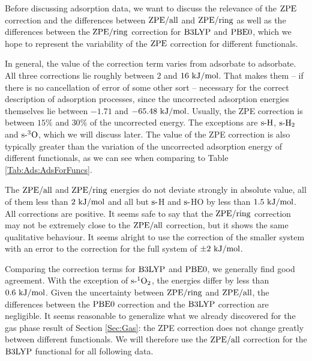 \documentclass[8.5pt,twoside,twocolumn]{article}
\newcommand\zpe{\enmat{\te{ZPE}}}
\newcommand\zpering{\enmat{\zpe/\te{ring}}}
\newcommand\zpeall{\enmat{\zpe/\te{all}}}
\newcommand\sur{\enmat{\te{s-}}}
\newcommand\tripo{\enmat{{^3\te{O}}}}
\newcommand\singot{\enmat{{^1\ot}}}
\newcommand\kmo{\enmat{\te {kJ/mol}}}
\theoremstyle{standard}
\begin{document}

Before discussing adsorption data, we want to discuss the relevance of the
$\zpe$ correction and the differences between $\zpeall$ and $\zpering$
as well as the differences between the $\zpering$ correction for $\text{B3LYP}$ and
$\text{PBE0}$, which we hope to represent the variability of the
$\zpe$ correction for different functionals.

In general, the value of the correction term varies from
adsorbate to adsorbate. All three corrections lie roughly between $2$
and $16~\kmo$. That makes them -- if there is no cancellation
of error of some other sort -- necessary for the correct description
of adsorption processes, since the uncorrected adsorption energies
themselves lie between $-1.71$ and $-65.48~\kmo$. Usually, the ZPE correction
is between $15\%$ and $30\%$ of the uncorrected energy. The exceptions are
$\sur{\te H}$, $\sur{\htw}$ and $\sur{\tripo}$, which we will discuss later. The
value of the ZPE correction is also typically greater than the variation of the
uncorrected adsorption energy of different functionals, as we can see when
comparing to Table \ref{Tab:Ads:AdsForFuncs}.

The $\zpeall$ and $\zpering$ energies
do not deviate strongly in absolute value, all of them less than $2~\kmo$
and all but $\sur$H and $\sur$HO by less than $1.5~\kmo$. All corrections are
positive.
It seems safe to say that the $\zpering$ correction may not be extremely
close to the $\zpeall$ correction, but it shows the same qualitative
behaviour. 
It seems alright to use the correction of the smaller system with an error to
the correction for the full system of $\pm 2~\kmo$.

Comparing the correction terms for $\text{B3LYP}$ and $\text{PBE0}$, we generally find
good agreement. With the exception of $\sur\singot$, the energies
differ by less than $0.6~\kmo$.
Given the uncertainty between $\zpering$ and $\zpeall$, the differences
between the  $\text{PBE0}$ correction and the $\text{B3LYP}$ correction are negligible.
It seems reasonable to generalize what we already discovered for the gas
phase result of Section \ref{Sec:Gas}: the ZPE correction does
not change greatly between different functionals. We will therefore
use the $\zpeall$ correction for the $\text{B3LYP}$ functional for all
following data.
\end{document}
